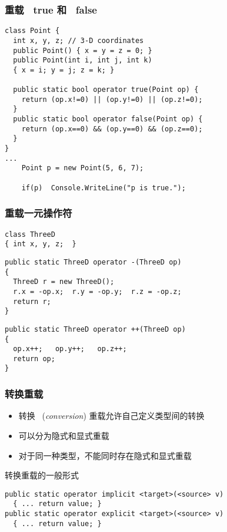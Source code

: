 \begin{frame}[fragile]
\frametitle{重载~ true 和~ false}
\begin{lstlisting}
class Point {
  int x, y, z; // 3-D coordinates
  public Point() { x = y = z = 0; }
  public Point(int i, int j, int k)
  { x = i; y = j; z = k; }

  public static bool operator true(Point op) {
    return (op.x!=0) || (op.y!=0) || (op.z!=0);
  }
  public static bool operator false(Point op) {
    return (op.x==0) && (op.y==0) && (op.z==0);
  }
}
...
    Point p = new Point(5, 6, 7);

    if(p)  Console.WriteLine("p is true.");
\end{lstlisting}
\end{frame}

\begin{frame}[fragile]
\frametitle{重载一元操作符}
\begin{lstlisting}
class ThreeD
{ int x, y, z;  }
\end{lstlisting}
\medskip
\begin{lstlisting}
public static ThreeD operator -(ThreeD op)
{
  ThreeD r = new ThreeD();
  r.x = -op.x;  r.y = -op.y;  r.z = -op.z;
  return r;
}
\end{lstlisting}
\medskip
\begin{lstlisting}
public static ThreeD operator ++(ThreeD op)
{
  op.x++;   op.y++;   op.z++;
  return op;
}
\end{lstlisting}
\end{frame}

\begin{frame}[fragile]
\frametitle{转换重载}
\begin{itemize}
\item 转换~ (\textit{conversion}) 重载允许自己定义类型间的转换
\item 可以分为隐式和显式重载
\item 对于同一种类型，不能同时存在隐式和显式重载
\end{itemize}
\pause
转换重载的一般形式
\begin{lstlisting}
public static operator implicit <target>(<source> v)
  { ... return value; }
public static operator explicit <target>(<source> v)
  { ... return value; }
\end{lstlisting}
\end{frame}

